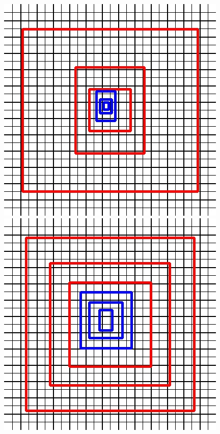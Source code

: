 	\begin{figure}[hbtp]
		\centering
		\begin{minipage}{0.3\textwidth}
			\includegraphics[width=\textwidth]{fig/yolov3_anchors}
		\end{minipage}
		\begin{minipage}{0.3\textwidth}
			\includegraphics[width=\textwidth]{fig/gate_anchors}

\end{minipage}
\end{figure}
